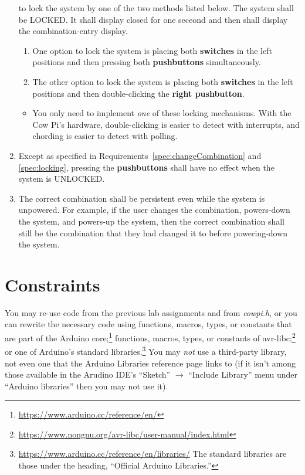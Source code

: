 \begin{enumerate}
    to lock the system by one of the two methods listed below. The system shall
    be LOCKED. It shall display {\dviiseg closed} for one seceond and then shall
    display the combination-entry display.
    \begin{enumerate}
    \item One option to lock the system is placing both \textbf{switches} in the
        left positions and then pressing both \textbf{pushbuttons}
        simultaneously.
    \item The other option to lock the system is placing both \textbf{switches}
        in the left positions and then double-clicking the \textbf{right
        pushbutton}.
    \end{enumerate}
    \begin{itemize}
    \item You only need to implement \textit{one} of these locking mechanisms.
        With the Cow Pi's hardware, double-clicking is easier to detect with
        interrupts, and chording is easier to detect with polling.
    \end{itemize}
\item Except as specified in Requirements~\ref{spec:changeCombination} and
    \ref{spec:locking}, pressing the \textbf{pushbuttons} shall have no effect
    when the system is UNLOCKED.
\item \label{spec:persistentCombination} The correct combination shall be
    persistent even while the system is unpowered. For example, if the user
    changes the combination, powers-down the system, and powers-up the system,
    then the correct combination shall still be the combination that they had
    changed it to before powering-down the system.
\end{enumerate}

\section{Constraints}\label{sec:Constraints}

You may re-use code from the previous lab assignments and from \textit{cowpi.h},
or you can rewrite the necessary code using functions, macros, types, or
constants that are part of the Arduino
core;\footnote{\url{https://www.arduino.cc/reference/en/}} functions, macros,
types, or constants of
avr-libc;\footnote{\url{https://www.nongnu.org/avr-libc/user-manual/index.html}}
or one of Arduino's standard
libraries.\footnote{\url{https://www.arduino.cc/reference/en/libraries/} The
standard libraries are those under the heading, ``Official Arduino Libraries.''}
You may \textit{not} use a third-party library, not even one that the Arduino
Libraries reference page links to (if it isn't among those available in the
Arudino IDE's ``Sketch'' $\rightarrow$ ``Include Library'' menu under ``Arduino
libraries'' then you may not use it).

